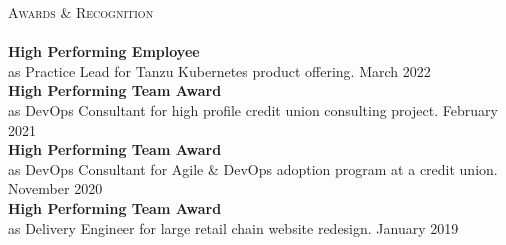 \documentclass[a4paper]{article}
\newcommand{\lineunder} {
    \vspace*{-8pt} \\
    \hspace*{-18pt} \hrulefill \\
}
\newcommand{\header} [1] {
    {\hspace*{-18pt}\vspace*{6pt} \textsc{#1}}
    \vspace*{-6pt} \lineunder
}
\begin{document}
\header{Awards \& Recognition}
\textbf{High Performing Employee}\\
as Practice Lead for Tanzu Kubernetes product offering. \hfill March 2022\\
\vspace*{2mm}
\textbf{High Performing Team Award}\\
as DevOps Consultant for high profile credit union consulting project. \hfill February 2021\\
\vspace*{2mm}
\textbf{High Performing Team Award}\\
as DevOps Consultant for Agile \& DevOps adoption program at a credit union. \hfill November 2020\\
\vspace*{2mm}
\textbf{High Performing Team Award}\\
as Delivery Engineer for large retail chain website redesign. \hfill January 2019\\
\vspace*{2mm}

\ 
\end{document}
